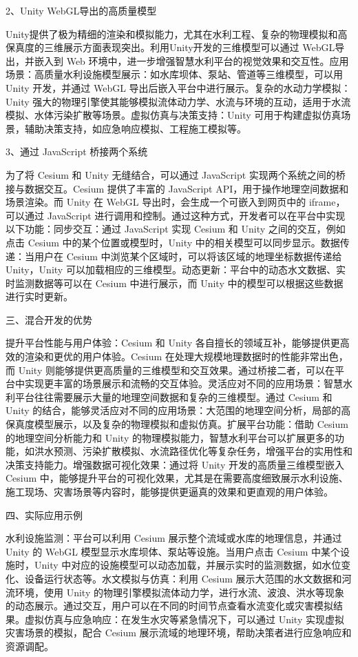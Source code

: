2、Unity WebGL导出的高质量模型

Unity提供了极为精细的渲染和模拟能力，尤其在水利工程、复杂的物理模拟和高保真度的三维展示方面表现突出。利用Unity开发的三维模型可以通过 WebGL导出，并嵌入到 Web 环境中，进一步增强智慧水利平台的视觉效果和交互性。应用场景：高质量水利设施模型展示：如水库坝体、泵站、管道等三维模型，可以用 Unity 开发，并通过 WebGL 导出后嵌入平台中进行展示。复杂的水动力学模拟：Unity 强大的物理引擎使其能够模拟流体动力学、水流与环境的互动，适用于水流模拟、水体污染扩散等场景。虚拟仿真与决策支持：Unity 可用于构建虚拟仿真场景，辅助决策支持，如应急响应模拟、工程施工模拟等。

3、通过 JavaScript 桥接两个系统

为了将 Cesium 和 Unity 无缝结合，可以通过 JavaScript 实现两个系统之间的桥接与数据交互。Cesium 提供了丰富的 JavaScript API，用于操作地理空间数据和场景渲染。而 Unity 在 WebGL 导出时，会生成一个可嵌入到网页中的 iframe，可以通过 JavaScript 进行调用和控制。通过这种方式，开发者可以在平台中实现以下功能：同步交互：通过 JavaScript 实现 Cesium 和 Unity 之间的交互，例如点击 Cesium 中的某个位置或模型时，Unity 中的相关模型可以同步显示。数据传递：当用户在 Cesium 中浏览某个区域时，可以将该区域的地理坐标数据传递给 Unity，Unity 可以加载相应的三维模型。动态更新：平台中的动态水文数据、实时监测数据等可以在 Cesium 中进行展示，而 Unity 中的模型可以根据这些数据进行实时更新。

三、混合开发的优势

提升平台性能与用户体验：Cesium 和 Unity 各自擅长的领域互补，能够提供更高效的渲染和更优的用户体验。Cesium 在处理大规模地理数据时的性能非常出色，而 Unity 则能够提供更高质量的三维模型和交互效果。通过桥接二者，可以在平台中实现更丰富的场景展示和流畅的交互体验。灵活应对不同的应用场景：智慧水利平台往往需要展示大量的地理空间数据和复杂的三维模型。通过 Cesium 和 Unity 的结合，能够灵活应对不同的应用场景：大范围的地理空间分析，局部的高保真度模型展示，以及复杂的物理模拟和虚拟仿真。扩展平台功能：借助 Cesium 的地理空间分析能力和 Unity 的物理模拟能力，智慧水利平台可以扩展更多的功能，如洪水预测、污染扩散模拟、水流路径优化等复杂任务，增强平台的实用性和决策支持能力。增强数据可视化效果：通过将 Unity 开发的高质量三维模型嵌入 Cesium 中，能够提升平台的可视化效果，尤其是在需要高度细致展示水利设施、施工现场、灾害场景等内容时，能够提供更逼真的效果和更直观的用户体验。

四、实际应用示例

水利设施监测：平台可以利用 Cesium 展示整个流域或水库的地理信息，并通过 Unity 的 WebGL 模型显示水库坝体、泵站等设施。当用户点击 Cesium 中某个设施时，Unity 中对应的设施模型可以动态加载，并展示实时的监测数据，如水位变化、设备运行状态等。水文模拟与仿真：利用 Cesium 展示大范围的水文数据和河流环境，使用 Unity 的物理引擎模拟流体动力学，进行水流、波浪、洪水等现象的动态展示。通过交互，用户可以在不同的时间节点查看水流变化或灾害模拟结果。虚拟仿真与应急响应：在发生水灾等紧急情况下，可以通过 Unity 实现虚拟灾害场景的模拟，配合 Cesium 展示流域的地理环境，帮助决策者进行应急响应和资源调配。

